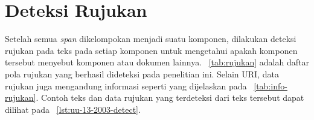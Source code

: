 \section{Deteksi Rujukan}
\label{sec:deteksi-rujukan}

Setelah semua \textit{span} dikelompokan menjadi suatu komponen, dilakukan deteksi rujukan pada teks
pada setiap komponen untuk mengetahui apakah komponen tersebut menyebut komponen atau dokumen \legal
lainnya. \tab~\ref{tab:rujukan} adalah daftar pola rujukan yang berhasil dideteksi pada penelitian
ini. Selain URI, data rujukan juga mengandung informasi seperti yang dijelaskan pada
\tab~\ref{tab:info-rujukan}. Contoh teks dan data rujukan yang terdeteksi dari teks tersebut dapat
dilihat pada \lst~\ref{lst:uu-13-2003-detect}.

